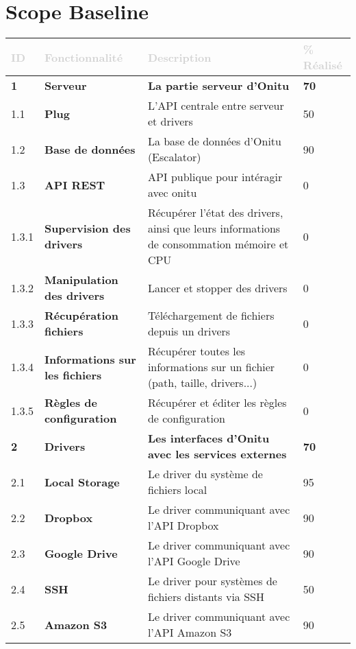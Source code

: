 \renewcommand{\chaptername}{}
\renewcommand{\thechapter}{}

\chapter{Scope Baseline}

\setlength{\tabcolsep}{8pt}
\renewcommand{\arraystretch}{1.5}

\begin{center}\begin{tabular}{|l l|l|l|}

\hline
\rowcolor{epiBlue}
\rowstyle{ \color{gray} \bfseries}
\textcolor{lightGray}{\textbf{ID}} & \textcolor{lightGray}{\textbf{Fonctionnalité}} & \textcolor{lightGray}{\textbf{Description}} & \textcolor{lightGray}{\textbf{\% Réalisé}} \tabularnewline
\hline
\rowcolor{gray}
	\textbf{1} & \textbf{Serveur} & \textbf{La partie serveur d'Onitu} & \textbf{70} \tabularnewline
\hline
\rowcolor{lightGray}
	1.1 & \textbf{Plug} & L'API centrale entre serveur et drivers & 50 \tabularnewline
\hline
\rowcolor{lightGray}
	1.2 & \textbf{Base de données} & La base de données d'Onitu (Escalator) & 90 \tabularnewline
\hline
\rowcolor{lightGray}
	1.3 & \textbf{API REST} & API publique pour intéragir avec onitu & 0 \tabularnewline
\hline
	1.3.1 & \textbf{Supervision des drivers} & Récupérer l'état des drivers, ainsi
que leurs informations de consommation mémoire et CPU & 0 \tabularnewline
\hline
	1.3.2 & \textbf{Manipulation des drivers} & Lancer et stopper des drivers & 0 \tabularnewline
\hline
	1.3.3 & \textbf{Récupération fichiers} & Téléchargement de fichiers depuis un
drivers & 0 \tabularnewline
\hline
	1.3.4 & \textbf{Informations sur les fichiers} & Récupérer toutes les
informations sur un fichier (path, taille, drivers...)  & 0 \tabularnewline
\hline
	1.3.5 & \textbf{Règles de configuration} & Récupérer et éditer les règles de configuration  & 0 \tabularnewline
\hline
\rowcolor{gray}
	\textbf{2} & \textbf{Drivers} & \textbf{Les interfaces d'Onitu avec les services externes} & \textbf{70} \tabularnewline
\hline
	2.1 & \textbf{Local Storage} & Le driver du système de fichiers local & 95 \tabularnewline
\hline
	2.2 & \textbf{Dropbox} & Le driver communiquant avec l'API Dropbox & 90 \tabularnewline
\hline
	2.3 & \textbf{Google Drive} & Le driver communiquant avec l'API Google Drive & 90 \tabularnewline
\hline
	2.4 & \textbf{SSH} & Le driver pour systèmes de fichiers distants via SSH & 50 \tabularnewline
\hline
	2.5 & \textbf{Amazon S3} & Le driver communiquant avec l'API Amazon S3 & 90 \tabularnewline

\end{tabular}
\end{center}
